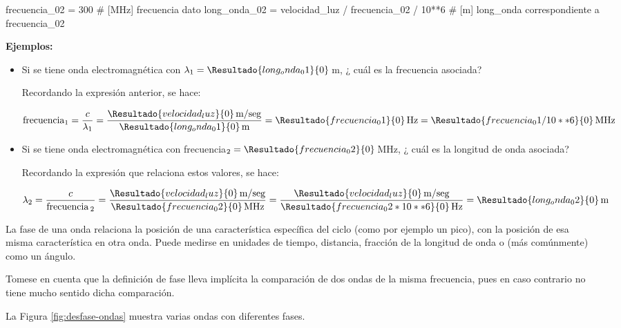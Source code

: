 \begin{description}
\begin{tcolorbox}
\begin{sagesilent}
frecuencia_02 = 300         # [MHz] frecuencia dato
long_onda_02  = velocidad_luz / frecuencia_02 / 10**6 # [m] long_onda correspondiente a frecuencia_02

  \end{sagesilent}

{\bf Ejemplos:}

  \begin{itemize}
  \item Si se tiene onda electromagn\'etica con $\lambda_1 =
    \Resultado{long_onda_01}{0}$\,m, ¿ cu\'al es la frecuencia
    asociada?

    Recordando la expresi\'on anterior, se hace:

    \[ \text{frecuencia}_1 = \displaystyle \frac{c}{\lambda_1} =
    \displaystyle
    \frac{\Resultado{velocidad_luz}{0}\text{\,m/seg}}{\Resultado{long_onda_01}{0}\text{\,m}}
    = \Resultado{frecuencia_01}{0}\,\text{Hz} =
    \Resultado{frecuencia_01 / 10**6}{0}\,\text{MHz}
    \]

  \item Si se tiene onda electromagn\'etica con frecuencia$_2 =
    \Resultado{frecuencia_02}{0}$\,MHz, ¿ cu\'al es la longitud de onda 
    asociada?

    Recordando la expresi\'on que relaciona estos valores, se hace:

\[ \displaystyle 
	\lambda_2 = \frac{c}{\text{frecuencia\,}_2} 
	= \frac{\Resultado{velocidad_luz}{0}\text{\,m/seg}}{\Resultado{frecuencia_02}{0}\text{\,MHz}}
	= \frac{\Resultado{velocidad_luz}{0}\text{\,m/seg}}{\Resultado{frecuencia_02 * 10**6 }{0}\text{\,Hz}}
	= \Resultado{long_onda_02}{0}\text{\,m}
\]

  \end{itemize}

\end{tcolorbox}


\item [Fase] La fase de una onda relaciona la posici\'on de una caracter\'istica espec\'ifica del ciclo (como por ejemplo un pico), con la posici\'on de esa misma caracter\'istica en otra onda. Puede medirse en unidades de tiempo, distancia, fracci\'on de la longitud de onda o (m\'as com\'unmente) como un \'angulo.

Tomese en cuenta que la definici\'on de fase lleva impl\'icita la comparaci\'on de dos ondas de la misma frecuencia, pues en caso contrario no tiene mucho sentido dicha comparaci\'on.

La Figura \ref{fig:desfase-ondas} muestra varias ondas con diferentes fases. 


\end{description}
